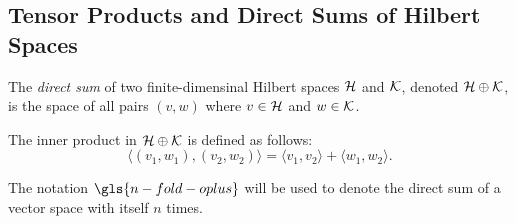 \subsection {Tensor Products and Direct Sums of Hilbert Spaces}

\begin{definition}
  The \emph{direct sum} of two finite-dimensinal Hilbert spaces $\mathcal{H}$ and $\mathcal{K}$, denoted $\mathcal{H} \oplus \mathcal{K}$, is the space of all pairs $(v, w)$ where $v \in \mathcal{H}$ and $w \in \mathcal{K}$.
\end{definition}

The inner product in $\mathcal{H} \oplus \mathcal{K}$ is defined as follows:
\begin{equation*}
  \langle (v_1, w_1), (v_2, w_2) \rangle = \langle v_1, v_2 \rangle + \langle w_1, w_2 \rangle.
\end{equation*}

The notation $\gls{n-fold-oplus}$ will be used to denote the direct sum of a vector space with itself $n$ times.





